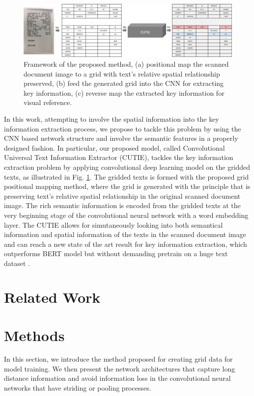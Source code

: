 \documentclass[10pt,twocolumn,letterpaper]{article}
\begin{document}
\begin{figure}
\begin{center}
\includegraphics[width=0.99\linewidth]{Model.png}
\end{center}
   \caption{Framework of the proposed method, (a) positional map the scanned document image to a grid with text's relative spatial relationship preserved, (b) feed the generated grid into the CNN for extracting key information, (c) reverse map the extracted key information for visual reference.}
\label{fig:cutie}
\end{figure}
In this work, attempting to involve the spatial information into the key information extraction process, we propose to tackle this problem by using the CNN based network structure and involve the semantic features in a properly designed fashion. In particular, our proposed model, called Convolutional Universal Text Information Extractor (CUTIE), tackles the key information extraction problem by applying convolutional deep learning model on the gridded texts, as illustrated in Fig. \ref{fig:cutie}. The gridded texts is formed with the proposed grid positional mapping method, where the grid is generated with the principle that is preserving text's relative spatial relationship in the original scanned document image. The rich semantic information is encoded from the gridded texts at the very beginning stage of the convolutional neural network with a word embedding layer. The CUTIE allows for simutaneously looking into both semantical information and spatial information of the texts in the scanned document image and can reach a new state of the art result for key information extraction, which outperforms BERT model but without demanding pretrain on a huge text dataset \cite{bert,transformer}.


\section{Related Work}


\section{Methods}
In this section, we introduce the method proposed for creating grid data for model training. We then present the network architectures that capture long distance information and avoid information loss in the convolutional neural networks that have striding or pooling processes.
\end{document}
